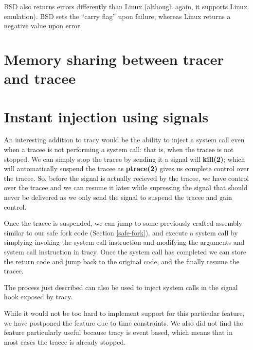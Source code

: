 \documentclass[a4paper, 10pt]{report}
\begin{document}
BSD also returns errors differently than Linux (although again, it supports
Linux emulation). BSD sets the ``carry flag'' upon failure, whereas Linux
returns a negative value upon error.

\section{Memory sharing between tracer and tracee}
\label{memory-share}


\section{Instant injection using signals}
\label{instant-inject}

An interesting addition to tracy would be the ability to inject a system call
even when a tracee is not performing a system call: that is, when the tracee
is not stopped. We can simply stop the tracee by sending it a signal will
\textbf{kill(2)}; which will automatically suspend the tracee as
\textbf{ptrace(2)} gives us complete control over the tracee.
So, before the signal is actually recieved by the tracee, we have control
over the tracee and we can resume it later while supressing the signal that
should never be delivered as we only send the signal to suspend the tracee and
gain control.

Once the tracee is suspended, we can jump to some previously crafted assembly
similar to our safe fork code (Section \ref{safe-fork}), and execute a system
call by simplying invoking the system call instruction and modifying the
arguments and system call instruction in tracy. Once the system call
has completed we can store the return code and jump back to the original code,
and the finally resume the tracee.

The process just described can also be used to inject system calls
in the signal hook exposed by tracy.

While it would not be too hard to implement support for this particular
feature, we have postponed the feature due to time constraints. We also
did not find the feature particularly useful because tracy is event based,
which means that in most cases the tracee is already stopped.



\end{document}
